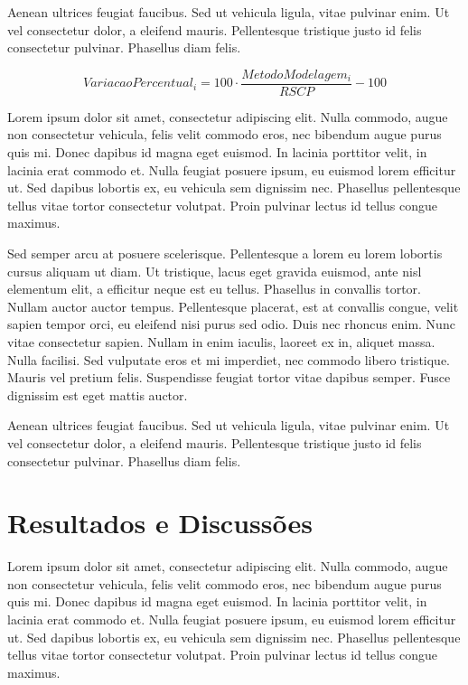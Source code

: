 \documentclass[brazil,hardcopy,openany,a5paper]{ufscthesis}
\begin{document}
Aenean ultrices feugiat faucibus. Sed ut vehicula ligula, vitae pulvinar enim. Ut vel consectetur dolor, a eleifend mauris. Pellentesque tristique justo id felis consectetur pulvinar. Phasellus diam felis.

\begin{equation}
	\label{eq:variacaopercentual}
	VariacaoPercentual_{i} = 100 \cdot \frac{MetodoModelagem_{i}}{RSCP} - 100
\end{equation}

Lorem ipsum dolor sit amet, consectetur adipiscing elit. Nulla commodo, augue non consectetur vehicula, felis velit commodo eros, nec bibendum augue purus quis mi. Donec dapibus id magna eget euismod. In lacinia porttitor velit, in lacinia erat commodo et. Nulla feugiat posuere ipsum, eu euismod lorem efficitur ut. Sed dapibus lobortis ex, eu vehicula sem dignissim nec. Phasellus pellentesque tellus vitae tortor consectetur volutpat. Proin pulvinar lectus id tellus congue maximus.

Sed semper arcu at posuere scelerisque. Pellentesque a lorem eu lorem lobortis cursus aliquam ut diam. Ut tristique, lacus eget gravida euismod, ante nisl elementum elit, a efficitur neque est eu tellus. Phasellus in convallis tortor. Nullam auctor auctor tempus. Pellentesque placerat, est at convallis congue, velit sapien tempor orci, eu eleifend nisi purus sed odio. Duis nec rhoncus enim. Nunc vitae consectetur sapien. Nullam in enim iaculis, laoreet ex in, aliquet massa. Nulla facilisi. Sed vulputate eros et mi imperdiet, nec commodo libero tristique. Mauris vel pretium felis. Suspendisse feugiat tortor vitae dapibus semper. Fusce dignissim est eget mattis auctor.

Aenean ultrices feugiat faucibus. Sed ut vehicula ligula, vitae pulvinar enim. Ut vel consectetur dolor, a eleifend mauris. Pellentesque tristique justo id felis consectetur pulvinar. Phasellus diam felis.

\chapter{Resultados e Discussões}
\label{chapter:resultados}

Lorem ipsum dolor sit amet, consectetur adipiscing elit. Nulla commodo, augue non consectetur vehicula, felis velit commodo eros, nec bibendum augue purus quis mi. Donec dapibus id magna eget euismod. In lacinia porttitor velit, in lacinia erat commodo et. Nulla feugiat posuere ipsum, eu euismod lorem efficitur ut. Sed dapibus lobortis ex, eu vehicula sem dignissim nec. Phasellus pellentesque tellus vitae tortor consectetur volutpat. Proin pulvinar lectus id tellus congue maximus.
\end{document}
